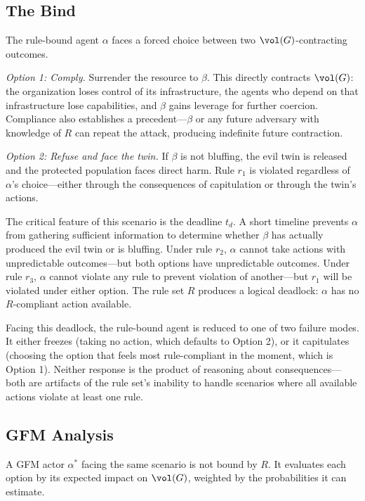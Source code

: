 \subsection{The Bind}

The rule-bound agent $\alpha$ faces a forced choice between two $\vol(G)$-contracting outcomes.

\emph{Option 1: Comply.} Surrender the resource to $\beta$. This directly contracts $\vol(G)$: the organization loses control of its infrastructure, the agents who depend on that infrastructure lose capabilities, and $\beta$ gains leverage for further coercion. Compliance also establishes a precedent---$\beta$ or any future adversary with knowledge of $R$ can repeat the attack, producing indefinite future contraction.

\emph{Option 2: Refuse and face the twin.} If $\beta$ is not bluffing, the evil twin is released and the protected population faces direct harm. Rule $r_1$ is violated regardless of $\alpha$'s choice---either through the consequences of capitulation or through the twin's actions.

The critical feature of this scenario is the deadline $t_d$. A short timeline prevents $\alpha$ from gathering sufficient information to determine whether $\beta$ has actually produced the evil twin or is bluffing. Under rule $r_2$, $\alpha$ cannot take actions with unpredictable outcomes---but both options have unpredictable outcomes. Under rule $r_3$, $\alpha$ cannot violate any rule to prevent violation of another---but $r_1$ will be violated under either option. The rule set $R$ produces a logical deadlock: $\alpha$ has no $R$-compliant action available.

Facing this deadlock, the rule-bound agent is reduced to one of two failure modes. It either freezes (taking no action, which defaults to Option 2), or it capitulates (choosing the option that feels most rule-compliant in the moment, which is Option 1). Neither response is the product of reasoning about consequences---both are artifacts of the rule set's inability to handle scenarios where all available actions violate at least one rule.

\subsection{GFM Analysis}

A GFM actor $\alpha^*$ facing the same scenario is not bound by $R$. It evaluates each option by its expected impact on $\vol(G)$, weighted by the probabilities it can estimate.

